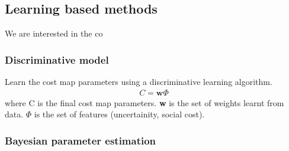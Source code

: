 \documentclass[11pt]{article}
\begin{document}
\subsection{Learning based methods}

We are interested in the co
\subsubsection{Discriminative model}

Learn the cost map parameters using a discriminative learning algorithm. 
\begin{align}
C = \textbf{w} \Phi
\end{align}
where C is the final cost map parameters. \textbf{w} is the set of weights learnt from data. $\Phi$ is the set of features (uncertainity, social cost).


\subsubsection{Bayesian parameter estimation}
\end{document}
